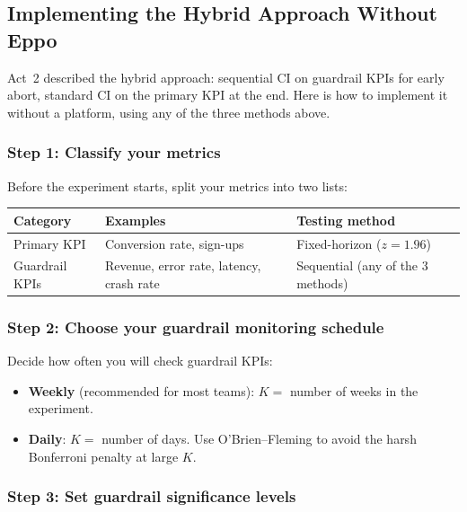 \documentclass[12pt, a4paper]{article}
\begin{document}
\subsection{Implementing the Hybrid Approach Without Eppo}

Act~2 described the hybrid approach: sequential CI on guardrail KPIs for
early abort, standard CI on the primary KPI at the end.  Here is how to
implement it without a platform, using any of the three methods above.

\subsubsection*{Step 1: Classify your metrics}

Before the experiment starts, split your metrics into two lists:

\begin{center}
\renewcommand{\arraystretch}{1.3}
\begin{tabular}{@{} l l l @{}}
\toprule
\textbf{Category} & \textbf{Examples} & \textbf{Testing method} \\
\midrule
Primary KPI & Conversion rate, sign-ups & Fixed-horizon ($z = 1.96$) \\
Guardrail KPIs & Revenue, error rate, latency, crash rate &
  Sequential (any of the 3 methods) \\
\bottomrule
\end{tabular}
\end{center}

\subsubsection*{Step 2: Choose your guardrail monitoring schedule}

Decide how often you will check guardrail KPIs:
\begin{itemize}[nosep]
  \item \textbf{Weekly} (recommended for most teams): $K = $ number of weeks
        in the experiment.
  \item \textbf{Daily}: $K = $ number of days.  Use O'Brien--Fleming to
        avoid the harsh Bonferroni penalty at large $K$.
\end{itemize}

\subsubsection*{Step 3: Set guardrail significance levels}
\end{document}
